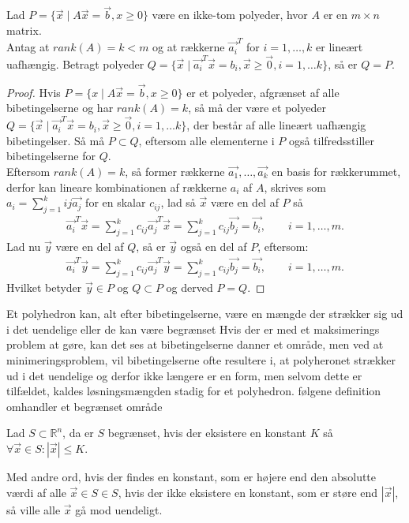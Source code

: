 \begin{stn} 
Lad $P=\{\vec{x}\mid A\vec{x}=\vec{b},x\geq 0\}$ være en ikke-tom polyeder, hvor $A$ er en $m\times n$ matrix.\\
Antag at $rank(A)=k<m$ og at rækkerne $\vec{a_i}^T$ for $i=1,\dots ,k$ er lineært uafhængig. Betragt polyeder $Q=\{\vec{x}\mid \vec{a_i}^T\vec{x}=b_{i}, \vec{x}\geq \vec{0}, i = 1,\dots	k\}$, så er $Q=P$.
\label{stn:PQ}
\end{stn}
\begin{proof}
Hvis $P=\{x\mid A\vec{x}=\vec{b},x\geq 0\}$ er et polyeder, afgrænset af alle bibetingelserne og har $rank(A)=k$, så må der være et polyeder $Q=\{\vec{x}\mid \vec{a_i}^T\vec{x}=b_{i}, \vec{x}\geq \vec{0}, i = 1,\dots	k\}$, der består af alle lineært uafhængig bibetingelser. Så må $P\subset Q$, eftersom alle elementerne i $P$ også tilfredsstiller bibetingelserne for $Q$.\\
Eftersom $rank(A)=k$, så former rækkerne $\vec{a_1},\dots ,\vec{a_k}$ en basis for rækkerummet, derfor kan lineare kombinationen af rækkerne $a_i$ af $A$, skrives som $a_i=\sum_{j=1}^{k}{i j}\vec{a_j}$ for en skalar $c_{i j}$, lad så $\vec{x}$ være en del af $P$ så
\begin{align*}
\vec{a_i}^T\vec{x}=\sum_{j=1}^{k}c_{i j}\vec{a_j}^T\vec{x}=\sum_{j=1}^{k}c_{i j}\vec{b_j}=\vec{b_i}, \qquad i=1,\dots,m.
\end{align*}
Lad nu $\vec{y}$ være en del af $Q$, så er $\vec{y}$ også en del af $P$, eftersom:
\begin{align*}
\vec{a_i}^T\vec{y}=\sum_{j=1}^{k}c_{i j}\vec{a_j}^T\vec{y}=\sum_{j=1}^{k}c_{i j}\vec{b_j}=\vec{b_i}, \qquad i=1,\dots,m.
\end{align*}
Hvilket betyder $\vec{y}\in P$ og $Q\subset P$ og derved $P=Q$.
\end{proof}
Et polyhedron kan, alt efter bibetingelserne, være en mængde der strækker sig ud i det uendelige eller de kan være begrænset 
Hvis der er med et maksimerings problem at gøre, kan det ses at bibetingelserne danner et område, men ved at minimeringsproblem, vil bibetingelserne ofte resultere i, at polyheronet strækker ud i det uendelige og derfor ikke længere er en form, men selvom dette er tilfældet, kaldes løsningsmængden stadig for et polyhedron.
følgene definition omhandler et begrænset område
\begin{defn} [Begrænset]
Lad $S \subset \mathds{R}^n$, da er $S$ begrænset, hvis der eksistere en konstant $K$ så $\forall \vec{x} \in S: |\vec{x}| \leq K$.
\end{defn}
Med andre ord, hvis der findes en konstant, som er højere end den absolutte værdi af alle $\vec{x} \in S \in S$, hvis der ikke eksistere en konstant, som er støre end $|\vec{x}|$, så ville alle $\vec{x}$ gå mod uendeligt.

